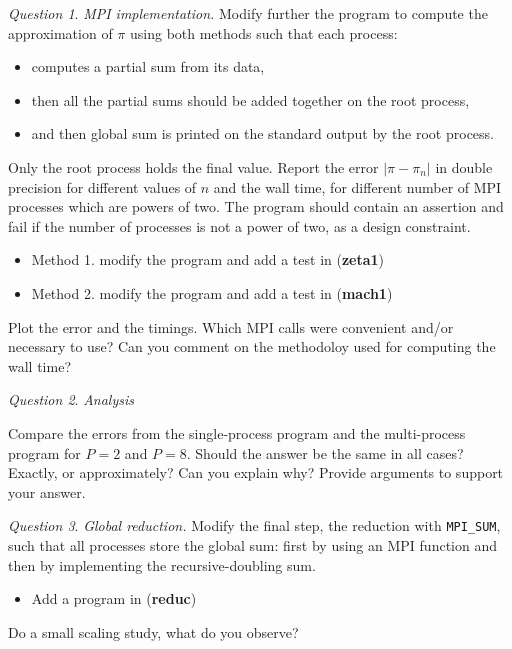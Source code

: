 \documentclass[onecolumn, oneside, a4paper, 11pt]{memoir}
\theoremstyle{remark}
\newtheorem{ex}{Question}
\begin{document}
\bigskip
\begin{ex}
\textit{MPI implementation.}
  Modify further the program to compute the approximation of $\pi$ using both methods such that each process:
  \begin{itemize}
  \item computes a partial sum from its data,
  \item then all the partial sums should be added together on the root process,
  \item and then global sum is printed on the standard output by the root process.
  \end{itemize}
 Only the root process holds the final value. Report the error $|\pi-\pi_n|$ in double precision for different values of $n$ and the wall time, for different number of MPI processes which are powers of two.
The program should contain an assertion and fail if the number of processes is not a power of two, as a design constraint.
\begin{itemize}
  \item Method 1. modify the program and add a test in (\textbf{zeta1})
  \item Method 2. modify the program and add a test in (\textbf{mach1})
\end{itemize}
Plot the error and the timings.
Which MPI calls were convenient and/or necessary to use?
Can you comment on the methodoloy used for computing the wall time?
\end{ex}

\bigskip
\begin{ex}
\textit{Analysis}
\item  Compare the errors from the single-process program and the multi-process  program for $P=2$ and $P=8$. Should the answer be the same in all cases?  Exactly, or approximately? Can you explain why? Provide arguments to support your answer.
\end{ex}

\bigskip
\begin{ex}
\textit{Global reduction.}
  Modify the final step, the reduction with \texttt{MPI\_SUM}, such that all processes store the global sum: first by using an MPI function and then by implementing the recursive-doubling sum.
\begin{itemize}
  \item Add a program in (\textbf{reduc})
\end{itemize}
Do a small scaling study, what do you observe?
\end{ex}
\end{document}
